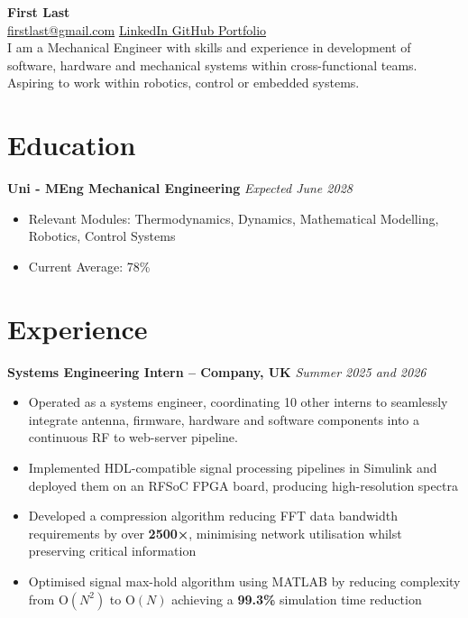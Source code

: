 \documentclass[a4paper,10pt]{article} %
\begin{document}
\pagestyle{empty}
\begin{center}
    {\huge\textbf{First Last}} \\
    \href{mailto:firstlast@gmail.com}{firstlast@gmail.com} \textbar{} \href{https://www.linkedin.com/in/firstlast}{LinkedIn \faLinkedinSquare} \textbar{} \href{https://github.com/firstlast}{GitHub \faGithub} \textbar{} \href{https://firstlast.github.io/Portfolio/}{Portfolio \faGlobe} \\
    \vspace{0.25cm}
    {\textrm{I am a Mechanical Engineer with skills and experience in development of software, hardware and mechanical systems within cross-functional teams. Aspiring to work within robotics, control or embedded systems.}}
\end{center}
\vspace{-0.75cm}
\section*{Education}
\noindent\textbf{Uni - MEng Mechanical Engineering} \hfill \textit{Expected June 2028}
\begin{itemize}
    \item Relevant Modules: Thermodynamics, Dynamics, Mathematical Modelling, Robotics, Control Systems
    \item Current Average: 78\%
\end{itemize}

\vspace{-0.5cm}
\section*{Experience}
\noindent\textbf{Systems Engineering Intern – Company, UK} \hfill \textit{Summer 2025 and 2026}
\begin{itemize}
    \item Operated as a systems engineer, coordinating 10 other interns to seamlessly integrate antenna, firmware, hardware and software components into a continuous RF to web-server pipeline.
    \item Implemented HDL-compatible signal processing pipelines in Simulink and deployed them on an RFSoC FPGA board, producing high-resolution spectra
    \item Developed a compression algorithm reducing FFT data bandwidth requirements by over \textbf{2500×}, minimising network utilisation whilst preserving critical information
    \item Optimised signal max-hold algorithm using MATLAB by reducing complexity from O$(N^2)$ to O$(N)$ achieving a \textbf{99.3\%} simulation time reduction
   
\end{itemize}
\vspace{-0.75em}
\end{document}
